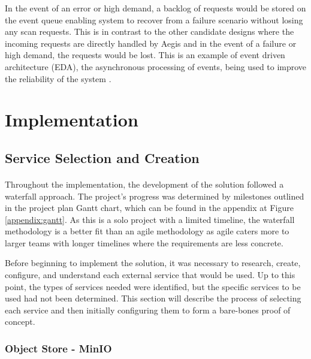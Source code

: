 \documentclass[12pt, conference, final, a4paper, onecolumn, compsoc]{IEEEtran}
\begin{document}
In the event of an error or high demand, a backlog of requests would be stored
on the event queue enabling system to recover from a failure scenario without
losing any scan requests. This is in contrast to the other candidate designs
where the incoming requests are directly handled by Aegis and in the event of a
failure or high demand, the requests would be lost. This is an example of event
driven architecture (EDA), the asynchronous processing of events, being used to improve the reliability of the system \citep{event-driven-arch}.

\section{Implementation}

\subsection{Service Selection and Creation}
\paragraph{}

Throughout the implementation, the development of the solution followed a
waterfall approach. The project's progress was determined by milestones outlined
in the project plan Gantt chart, which can be found in the appendix at Figure
\ref{appendix:gantt}. As this is a solo project with a limited timeline, the
waterfall methodology is a better fit than an agile methodology as agile caters
more to larger teams with longer timelines where the requirements are less
concrete.

Before beginning to implement the solution, it was necessary to research,
create, configure, and understand each external service that would be used. Up
to this point, the types of services needed were identified, but the specific
services to be used had not been determined. This section will describe the
process of selecting each service and then initially configuring them to form a
bare-bones proof of concept.

\subsubsection*{Object Store - MinIO}
\paragraph{}
\end{document}
